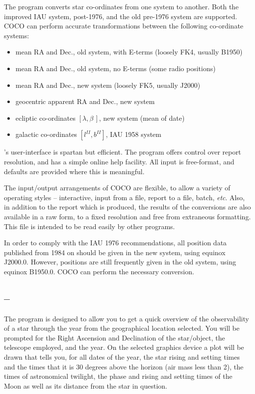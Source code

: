 The {\COCOref} program converts star co-ordinates from one system to another.  Both
the improved IAU system, post-1976, and the old pre-1976 system are
supported. COCO can perform accurate transformations between the following
co-ordinate systems: 

\begin{itemize}
\item mean RA and Dec., old system, with E-terms (loosely FK4, usually B1950)
\item mean RA and Dec., old system, no E-terms (some radio positions)
\item mean RA and Dec., new system (loosely FK5, usually J2000)
\item geocentric apparent RA and Dec., new system
\item ecliptic co-ordinates $[\lambda,\beta\,]$, new system (mean of date)
\item galactic co-ordinates $[l^{II},b^{II}]$, IAU 1958 system
\end{itemize}

{\COCOref}'s user-interface is spartan but efficient.  The program offers control
over report resolution, and has a simple online help facility. All
input is free-format, and defaults are provided where this is meaningful. 
 
The input/output arrangements of COCO are flexible, to allow a variety of
operating styles -- interactive, input from a file, report to a file, batch,
{\it etc}. Also, in addition to the report which is produced, the results of
the conversions are also available in a raw form, to a fixed resolution and
free from extraneous formatting.
This file is intended to be read easily by other programs. 
 
In order to comply with the IAU 1976 recommendations, all position data
published from 1984 on should be given in the new system, using equinox
J2000.0. However, positions are still frequently given in the old system,
using equinox B1950.0. COCO can perform the necessary conversion.


\subsection{{\OBSERVEref} -- {\STARLINKref}} 
\label{sec:observe}
 
The program {\OBSERVEref} is designed to allow you to get a quick overview
of the observability of a star through the year from the geographical
location selected. You will be prompted for the Right Ascension and Declination 
of the star/object, the telescope employed, and the year. On the selected 
graphics device a
plot will be drawn that tells you, for all dates of the year, the star rising
and setting times and the times that it is 30 degrees above the horizon 
(air mass less than 2), the
times of astronomical twilight, the phase and rising and setting times of the
Moon as well as its distance from the star in question. 
 
